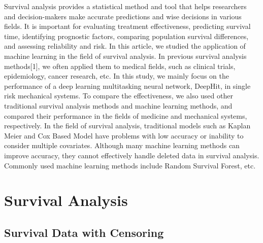 \documentclass[conference]{IEEEconf}
\begin{document}
Survival analysis provides a statistical method and tool that helps researchers and decision-makers make accurate predictions and wise decisions in various fields. It is important for evaluating treatment effectiveness, predicting survival time, identifying prognostic factors, comparing population survival differences, and assessing reliability and risk. In this article, we studied the application of machine learning in the field of survival analysis. In previous survival analysis methods[1], we often applied them to medical fields, such as clinical trials, epidemiology, cancer research, etc. In this study, we mainly focus on the performance of a deep learning multitasking neural network, DeepHit, in single risk mechanical systems. To compare the effectiveness, we also used other traditional survival analysis methods and machine learning methods, and compared their performance in the fields of medicine and mechanical systems, respectively. In the field of survival analysis, traditional models such as Kaplan Meier and Cox Based Model have problems with low accuracy or inability to consider multiple covariates. Although many machine learning methods can improve accuracy, they cannot effectively handle deleted data in survival analysis. Commonly used machine learning methods include Random Survival Forest, etc. 

\section{Survival Analysis}

\subsection{Survival Data with Censoring}
\end{document}
